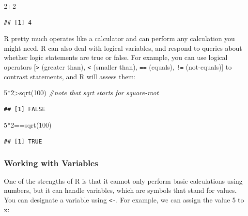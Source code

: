 \documentclass[
]{book}
\newenvironment{Shaded}{\begin{snugshade}}{\end{snugshade}}
\newcommand{\CommentTok}[1]{\textcolor[rgb]{0.56,0.35,0.01}{\textit{#1}}}
\newcommand{\DecValTok}[1]{\textcolor[rgb]{0.00,0.00,0.81}{#1}}
\newcommand{\FunctionTok}[1]{\textcolor[rgb]{0.00,0.00,0.00}{#1}}
\newcommand{\NormalTok}[1]{#1}
\newcommand{\SpecialCharTok}[1]{\textcolor[rgb]{0.00,0.00,0.00}{#1}}
\begin{document}
\begin{Shaded}
\begin{Highlighting}[]
\DecValTok{2}\SpecialCharTok{+}\DecValTok{2}
\end{Highlighting}
\end{Shaded}

\begin{verbatim}
## [1] 4
\end{verbatim}

R pretty much operates like a calculator and can perform any calculation you might need. R can also deal with logical variables, and respond to queries about whether logic statements are true or false. For example, you can use logical operators {[}\texttt{\textgreater{}} (greater than), \texttt{\textless{}} (smaller than), \texttt{==} (equals), \texttt{!=} (not-equals){]} to contrast statements, and R will assess them:

\begin{Shaded}
\begin{Highlighting}[]
\DecValTok{5}\SpecialCharTok{*}\DecValTok{2}\SpecialCharTok{\textgreater{}}\FunctionTok{sqrt}\NormalTok{(}\DecValTok{100}\NormalTok{) }\CommentTok{\#note that sqrt starts for square{-}root}
\end{Highlighting}
\end{Shaded}

\begin{verbatim}
## [1] FALSE
\end{verbatim}

\begin{Shaded}
\begin{Highlighting}[]
\DecValTok{5}\SpecialCharTok{*}\DecValTok{2}\SpecialCharTok{==}\FunctionTok{sqrt}\NormalTok{(}\DecValTok{100}\NormalTok{)}
\end{Highlighting}
\end{Shaded}

\begin{verbatim}
## [1] TRUE
\end{verbatim}

\hypertarget{working-with-variables}{%
\subsubsection*{Working with Variables}\label{working-with-variables}}

One of the strengths of R is that it cannot only perform basic calculations using numbers, but it can handle variables, which are symbols that stand for values. You can designate a variable using \texttt{\textless{}-}. For example, we can assign the value 5 to x:
\end{document}
